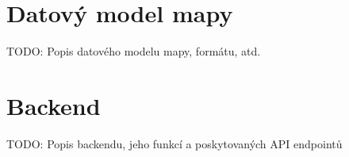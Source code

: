 \section{Datový model mapy}
\label{sec:specifikace-datovy-model}
TODO: Popis datového modelu mapy, formátu, atd.

\section{Backend}
\label{sec:specifikace-backend}
TODO: Popis backendu, jeho funkcí a poskytovaných API endpointů
